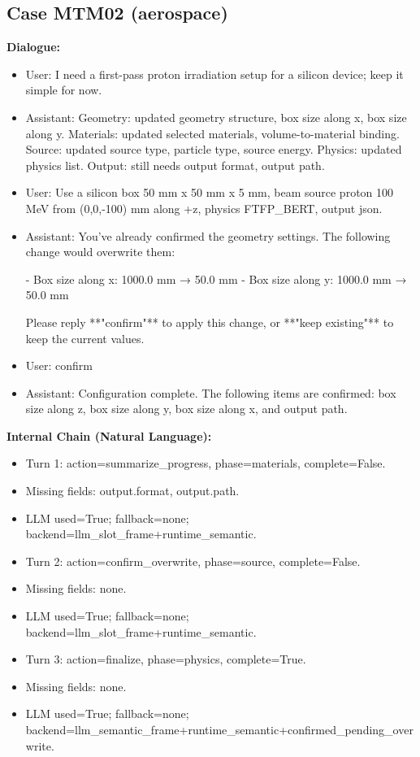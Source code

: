 \documentclass[11pt]{ctexart}
\begin{document}
\subsection{Case MTM02 (aerospace)}
\textbf{Dialogue:}
\begin{itemize}
\item User: I need a first-pass proton irradiation setup for a silicon device; keep it simple for now.
\item Assistant: Geometry: updated geometry structure, box size along x, box size along y. Materials: updated selected materials, volume-to-material binding. Source: updated source type, particle type, source energy. Physics: updated physics list. Output: still needs output format, output path.
\item User: Use a silicon box 50 mm x 50 mm x 5 mm, beam source proton 100 MeV from (0,0,-100) mm along +z, physics FTFP\_BERT, output json.
\item Assistant: You've already confirmed the geometry settings. The following change would overwrite them:

- Box size along x: 1000.0 mm → 50.0 mm
- Box size along y: 1000.0 mm → 50.0 mm

Please reply **"confirm"** to apply this change, or **"keep existing"** to keep the current values.
\item User: confirm
\item Assistant: Configuration complete. The following items are confirmed: box size along z, box size along y, box size along x, and output path.
\end{itemize}
\textbf{Internal Chain (Natural Language):}
\begin{itemize}
\item Turn 1: action=summarize\_progress, phase=materials, complete=False.
\item Missing fields: output.format, output.path.
\item LLM used=True; fallback=none; backend=llm\_slot\_frame+runtime\_semantic.
\item Turn 2: action=confirm\_overwrite, phase=source, complete=False.
\item Missing fields: none.
\item LLM used=True; fallback=none; backend=llm\_slot\_frame+runtime\_semantic.
\item Turn 3: action=finalize, phase=physics, complete=True.
\item Missing fields: none.
\item LLM used=True; fallback=none; backend=llm\_semantic\_frame+runtime\_semantic+confirmed\_pending\_overwrite.
\end{itemize}
\end{document}
